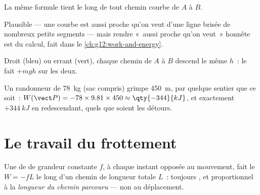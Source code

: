 \begin{proposition}\label{prop:g11:work-of-force:anypath}
La même formule tient le long de tout chemin courbe de $A$ à $B$.
\end{proposition}
\admitted

\begin{remark}\label{rem:g11:work-of-force:anypath}
Plausible --- une courbe est aussi proche qu'on veut d'une ligne brisée
de nombreux petits segments --- mais rendre «~aussi proche qu'on
veut~» honnête est du calcul, fait dans le
\cref{ch:g12:work-and-energy}.
\end{remark}

\begin{omfigure}

{\small Droit (bleu) ou errant (vert), chaque chemin de $A$ à $B$
descend le même $h$~: le  fait
$+mgh$ sur les deux.}
\end{omfigure}

\begin{example}[Randonneur]\label{ex:g11:work-of-force:hiker}
Un randonneur de \qty{78}{kg} (sac compris) grimpe \qty{450}{m}, par
quelque sentier que ce soit~: $W(\vect P) = -78 \times 9.81 \times 450
\approx \qty{-344}{kJ}$, et exactement $+\qty{344}{kJ}$ en
redescendant, quels que soient les détours.
\end{example}

\section{Le travail du frottement}

\begin{proposition}\label{prop:g11:work-of-force:friction}
Une  de
 de grandeur constante $f$, à
chaque instant opposée au mouvement, fait le
 $W = -fL$ le long d'un chemin de
longueur totale $L$~: toujours
, et proportionnel à la
\emph{longueur du chemin parcouru} --- non au déplacement.
\end{proposition}

